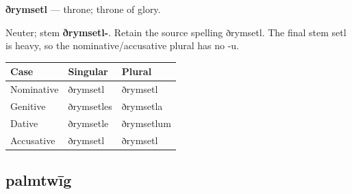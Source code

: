 \par\begin{minipage}{\linewidth}\raggedright
\textbf{ðrymsetl} — throne; throne of glory.

Neuter; stem \textbf{ðrymsetl-}. Retain the source spelling ðrymsetl. The final stem setl is heavy, so the nominative/\allowbreak{}accusative plural has no -u.

\par\begingroup
\fontsize{10.5}{13.2}\selectfont
\setlength{\LTleft}{0pt}\setlength{\LTright}{\fill}
\noindent
\begin{tabular}{@{}>{\raggedright\arraybackslash}p{39.46mm}>{\raggedright\arraybackslash}p{39.46mm}>{\raggedright\arraybackslash}p{39.46mm}@{}}
\toprule
\textbf{Case} & \textbf{Singular} & \textbf{Plural} \\
\midrule
Nominative & ðrymsetl & ðrymsetl \\
Genitive & ðrymsetles & ðrymsetla \\
Dative & ðrymsetle & ðrymsetlum \\
Accusative & ðrymsetl & ðrymsetl \\
\bottomrule
\end{tabular}
\par\endgroup

\end{minipage}\par
{}
\subsection*{palmtwīg}

